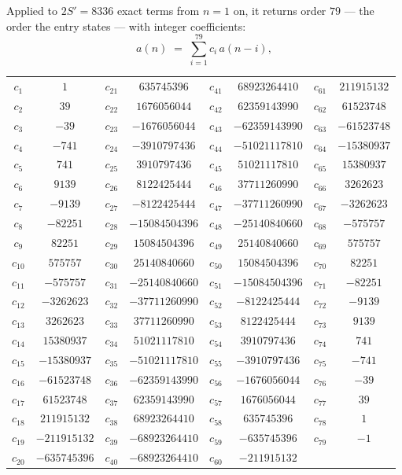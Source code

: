 \documentclass[11pt,a4paper]{article}
\theoremstyle{plain}
\theoremstyle{definition}
\begin{document}
Applied to $2S'=8336$ exact terms from $n=1$ on, it returns order $79$ --- the
order the entry states --- with integer coefficients:
\[
a(n)\;=\;\sum_{i=1}^{79}c_i\,a(n-i),
\]
\begin{center}\small
\begin{tabular}{cccccccc}
$c_{1}$ & $1$ & $c_{21}$ & $635745396$ & $c_{41}$ & $68923264410$ & $c_{61}$ & $211915132$ \\
$c_{2}$ & $39$ & $c_{22}$ & $1676056044$ & $c_{42}$ & $62359143990$ & $c_{62}$ & $61523748$ \\
$c_{3}$ & $-39$ & $c_{23}$ & $-1676056044$ & $c_{43}$ & $-62359143990$ & $c_{63}$ & $-61523748$ \\
$c_{4}$ & $-741$ & $c_{24}$ & $-3910797436$ & $c_{44}$ & $-51021117810$ & $c_{64}$ & $-15380937$ \\
$c_{5}$ & $741$ & $c_{25}$ & $3910797436$ & $c_{45}$ & $51021117810$ & $c_{65}$ & $15380937$ \\
$c_{6}$ & $9139$ & $c_{26}$ & $8122425444$ & $c_{46}$ & $37711260990$ & $c_{66}$ & $3262623$ \\
$c_{7}$ & $-9139$ & $c_{27}$ & $-8122425444$ & $c_{47}$ & $-37711260990$ & $c_{67}$ & $-3262623$ \\
$c_{8}$ & $-82251$ & $c_{28}$ & $-15084504396$ & $c_{48}$ & $-25140840660$ & $c_{68}$ & $-575757$ \\
$c_{9}$ & $82251$ & $c_{29}$ & $15084504396$ & $c_{49}$ & $25140840660$ & $c_{69}$ & $575757$ \\
$c_{10}$ & $575757$ & $c_{30}$ & $25140840660$ & $c_{50}$ & $15084504396$ & $c_{70}$ & $82251$ \\
$c_{11}$ & $-575757$ & $c_{31}$ & $-25140840660$ & $c_{51}$ & $-15084504396$ & $c_{71}$ & $-82251$ \\
$c_{12}$ & $-3262623$ & $c_{32}$ & $-37711260990$ & $c_{52}$ & $-8122425444$ & $c_{72}$ & $-9139$ \\
$c_{13}$ & $3262623$ & $c_{33}$ & $37711260990$ & $c_{53}$ & $8122425444$ & $c_{73}$ & $9139$ \\
$c_{14}$ & $15380937$ & $c_{34}$ & $51021117810$ & $c_{54}$ & $3910797436$ & $c_{74}$ & $741$ \\
$c_{15}$ & $-15380937$ & $c_{35}$ & $-51021117810$ & $c_{55}$ & $-3910797436$ & $c_{75}$ & $-741$ \\
$c_{16}$ & $-61523748$ & $c_{36}$ & $-62359143990$ & $c_{56}$ & $-1676056044$ & $c_{76}$ & $-39$ \\
$c_{17}$ & $61523748$ & $c_{37}$ & $62359143990$ & $c_{57}$ & $1676056044$ & $c_{77}$ & $39$ \\
$c_{18}$ & $211915132$ & $c_{38}$ & $68923264410$ & $c_{58}$ & $635745396$ & $c_{78}$ & $1$ \\
$c_{19}$ & $-211915132$ & $c_{39}$ & $-68923264410$ & $c_{59}$ & $-635745396$ & $c_{79}$ & $-1$ \\
$c_{20}$ & $-635745396$ & $c_{40}$ & $-68923264410$ & $c_{60}$ & $-211915132$ &  &  \\
\end{tabular}
\end{center}
\end{document}
